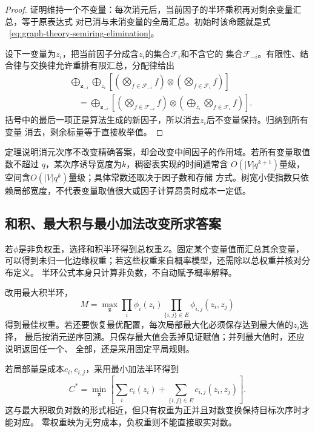 \begin{proof}
证明维持一个不变量：每次消元后，当前因子的半环乘积再对剩余变量汇总，等于原表达式
对已消与未消变量的全局汇总。初始时该命题就是式
~\eqref{eq:graph-theory-semiring-elimination}。

设下一变量为\(z_i\)，把当前因子分成含\(z_i\)的集合\(\mathcal{F}_i\)和不含它的
集合\(\mathcal{F}_{-i}\)。有限性、结合律与交换律允许重排有限汇总，分配律给出
\begin{align*}
  &\bigoplus_{\bm{z}_{-i}}\bigoplus_{z_i}\left[
    \left(\bigotimes_{f\in\mathcal{F}_{-i}}f\right)
    \otimes
    \left(\bigotimes_{f\in\mathcal{F}_i}f\right)
  \right]\\
  &\quad=\bigoplus_{\bm{z}_{-i}}\left[
    \left(\bigotimes_{f\in\mathcal{F}_{-i}}f\right)
    \otimes
    \left(
      \bigoplus_{z_i}
      \bigotimes_{f\in\mathcal{F}_i}f
    \right)
  \right].
\end{align*}
括号中的最后一项正是算法生成的新因子，所以消去\(z_i\)后不变量保持。归纳到所有变量
消去，剩余标量等于直接枚举值。
\end{proof}

定理说明消元次序不改变精确答案，却会改变中间因子的作用域。若所有变量取值数不超过
\(q\)，某次序诱导宽度为\(k\)，稠密表实现的时间通常含
\(O(|V|q^{k+1})\)量级，空间含\(O(|V|q^k)\)量级；具体常数还取决于因子数和存储
方式。树宽小使指数只依赖局部宽度，不代表变量取值很大或因子计算昂贵时成本一定低。

\subsection{和积、最大积与最小加法改变所求答案}

若\(\phi\)是非负权重，选择和积半环得到总权重\(Z\)。固定某个变量值而汇总其余变量，
可以得到未归一化边缘权重；若这些权重来自概率模型，还需除以总权重并核对分布定义。
半环公式本身只计算非负数，不自动赋予概率解释。

改用最大积半环，
\[
  M=\max_{\bm{z}}\prod_i\phi_i(z_i)
  \prod_{\{i,j\}\in E}\phi_{i,j}(z_i,z_j)
\]
得到最佳权重。若还要恢复最优配置，每次局部最大化必须保存达到最大值的\(z_i\)选择，
最后按消元逆序回溯。只保存最大值会丢掉见证赋值；并列最大值时，还应说明返回任一个、
全部，还是采用固定平局规则。

若局部量是成本\(c_i,c_{i,j}\)，采用最小加法半环得到
\[
  C^*=\min_{\bm{z}}\left[
    \sum_i c_i(z_i)+\sum_{\{i,j\}\in E}c_{i,j}(z_i,z_j)
  \right].
\]
这与最大积取负对数的形式相近，但只有权重为正并且对数变换保持目标次序时才能对应。
零权重映为无穷成本，负权重则不能直接取实对数。

